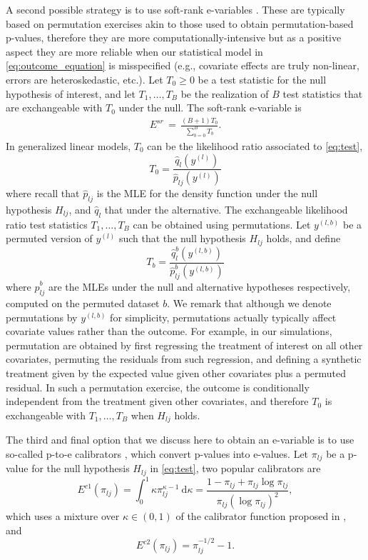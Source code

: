 \documentclass[pdflatex,sn-mathphys-num]{sn-jnl}%
\theoremstyle{thmstyleone}%
\theoremstyle{thmstyletwo}%
\theoremstyle{thmstylethree}%
\begin{document}
A second possible strategy is to use soft-rank e-variables \citep{koning:2023}. 
These are typically based on permutation exercises akin to those used to obtain permutation-based p-values, therefore they are more computationally-intensive but as a positive aspect they are more reliable when our statistical model in \eqref{eq:outcome_equation} is misspecified (e.g., covariate effects are truly non-linear, errors are heteroskedastic, etc.).
Let $T_0 \geq 0$ be a test statistic for the null hypothesis of interest, and let $T_1,\ldots,T_B$ be the realization of $B$ test statistics that are exchangeable with $T_0$ under the null. The soft-rank e-variable is 
\begin{align}
  E^{sr} \,=\,\frac{(B+1)T_0}{\sum_{b=0}^{B}T_b}.
\end{align}
In generalized linear models, %
$T_0$ can be the likelihood ratio associated to \eqref{eq:test},
\begin{equation}\label{eq:lrt}
  T_0=\frac{\hat{q}_l(y^{(l)})}{ \hat{p}_{lj}(y^{(l)})}
\end{equation}
where recall that $\hat{p}_{lj}$ is the MLE for the density function under the null hypothesis $H_{lj}$, and $\hat{q}_l$ that under the alternative. 
The exchangeable likelihood ratio test statistics $T_1,\ldots,T_B$ can be obtained using permutations. 
Let $y^{(l,b)}$ be a permuted version of $y^{(l)}$ such that the null hypothesis $H_{lj}$ holds, and define
\[T_b=\frac{\hat{q}^{b}_l(y^{(l,b)})}{ \hat{p}^b_{lj}(y^{(l,b)})}\] 
where $\hat{p}^b_{lj}$ are the MLEs under the null and alternative hypotheses respectively, computed on the permuted dataset $b$. We remark that although we denote permutations by $y^{(l,b)}$ for simplicity, permutations actually typically affect covariate values rather than the outcome. For example, in our simulations, permutation are obtained by first regressing the treatment of interest on all other covariates, permuting the residuals from such regression, and defining a synthetic treatment given by the expected value given other covariates plus a permuted residual. In such a permutation exercise, the outcome is conditionally independent from the treatment given other covariates, and therefore $T_0$ is exchangeable with $T_1,\ldots,T_B$ when $H_{lj}$ holds.

The third and final option that we discuss here to obtain an e-variable is to use so-called p-to-e calibrators \cite{ramdas:2025}, which convert p-values into e-values. Let $\pi_{lj}$ be a p-value for the null hypothesis $H_{lj}$ in \eqref{eq:test}, two popular calibrators are
\begin{equation}
  E^{c1}(\pi_{lj})=\int_0^1 \kappa \pi_{lj}^{\kappa-1} \mathrm{~d} \kappa=\frac{1-\pi_{lj}+\pi_{lj} \log \pi_{lj}}{\pi_{lj}(\log \pi_{lj})^2},
\label{eq:calibrator1}
\end{equation}
which uses a mixture over $\kappa\in(0,1)$ of the calibrator function proposed in \cite{shafer:2011}, and
\begin{equation}
  E^{c2}(\pi_{lj})=\pi_{lj}^{-1/2} -1.
\label{eq:calibrator2}
\end{equation}
\end{document}
